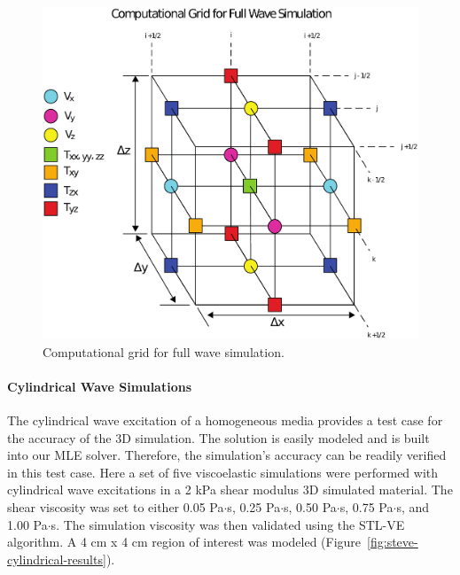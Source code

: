 \begin{figure}[htb!]
    \centering
    \includegraphics[width=0.75\linewidth]{steve/figs/image11.png}
    \caption{Computational grid for full wave simulation.} 
\label{fig:steve-full-wave-grid}
\end{figure}

\paragraph{Cylindrical Wave Simulations}
The cylindrical wave excitation of a homogeneous media provides a test case for
the accuracy of the 3D simulation. The solution is easily modeled and is built
into our MLE solver. Therefore, the simulation’s accuracy can be readily
verified in this test case. Here a set of five viscoelastic simulations were
performed with cylindrical wave excitations in a 2 kPa shear modulus 3D
simulated material. The shear viscosity was set to either 0.05 Pa$\cdot$s, 0.25
Pa$\cdot$s, 0.50 Pa$\cdot$s, 0.75 Pa$\cdot$s, and 1.00 Pa$\cdot$s. The
simulation viscosity was then validated using the STL-VE algorithm. A 4 cm x 4
cm region of interest was modeled (Figure~\ref{fig:steve-cylindrical-results}). 

